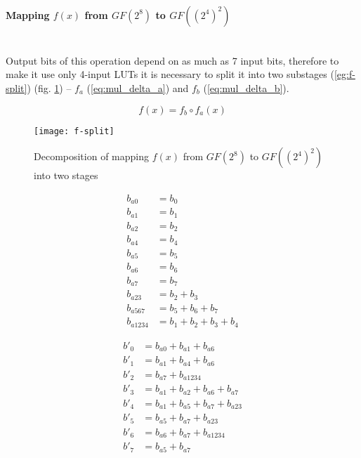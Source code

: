 \paragraph{Mapping $f(x)$ from $GF(2^8)$ to $GF((2^4)^2)$}\mbox{}\\
Output bits of this operation depend on as much as 7 input bits, therefore to make it use only 4-input LUTs it is necessary to split it into two substages (\ref{eg:f-split}) (fig. \ref{fig:f-split}) -- $f_a$ (\ref{eq:mul_delta_a}) and $f_b$ (\ref{eq:mul_delta_b}).

\begin{equation}
\label{eg:f-split}
f(x) = f_b \circ f_a(x)
\end{equation}

\begin{figure}[!h]
\centering
\texttt{[image: f-split]}
\caption{Decomposition of mapping $f(x)$ from $GF(2^8)$ to $GF((2^4)^2)$ into two stages}
\label{fig:f-split}
\end{figure}

\begin{equation}
\label{eq:mul_delta_a}
\begin{aligned}
b_{a0}    &= b_0                    \\
b_{a1}    &= b_1                    \\
b_{a2}    &= b_2                    \\
b_{a4}    &= b_4                    \\
b_{a5}    &= b_5                    \\
b_{a6}    &= b_6                    \\
b_{a7}    &= b_7                    \\
b_{a23}   &= b_2 + b_3              \\
b_{a567}  &= b_5 + b_6 + b_7        \\
b_{a1234} &= b_1 + b_2 + b_3 + b_4
\end{aligned}
\end{equation}

\begin{equation}
\label{eq:mul_delta_b}
\begin{aligned}
b'_0 &= b_{a0} + b_{a1} + b_{a6}           \\
b'_1 &= b_{a1} + b_{a4} + b_{a6}           \\
b'_2 &= b_{a7} + b_{a1234}                 \\
b'_3 &= b_{a1} + b_{a2} + b_{a6} + b_{a7}  \\
b'_4 &= b_{a1} + b_{a5} + b_{a7} + b_{a23} \\
b'_5 &= b_{a5} + b_{a7} + b_{a23}          \\
b'_6 &= b_{a6} + b_{a7} + b_{a1234}        \\
b'_7 &= b_{a5} + b_{a7}                    
\end{aligned}
\end{equation}

